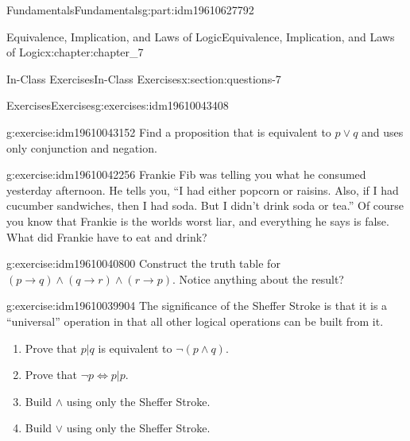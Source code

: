 \documentclass[oneside,10pt,]{book}
\numberwithin{equation}{section}
\begin{document}
\begin{partptx}{Fundamentals}{}{Fundamentals}{}{}{g:part:idm19610627792}
\begin{chapterptx}{Equivalence, Implication, and Laws of Logic}{}{Equivalence, Implication, and Laws of Logic}{}{}{x:chapter:chapter_7}
\typeout{************************************************}
%
\begin{sectionptx}{In-Class Exercises}{}{In-Class Exercises}{}{}{x:section:questions-7}
%
%
%
\typeout{************************************************}
\typeout{************************************************}
%
\begin{exercises-subsection-numberless}{Exercises}{}{Exercises}{}{}{g:exercises:idm19610043408}
\par\medskip\noindent%
%
\begin{exercisegroup}
\begin{divisionexerciseeg}{1}{}{}{g:exercise:idm19610043152}%
Find a proposition that is equivalent to \(p \lor  q\) and uses only conjunction and negation.%
\end{divisionexerciseeg}%
\begin{divisionexerciseeg}{2}{}{}{g:exercise:idm19610042256}%
Frankie Fib was telling you what he consumed yesterday afternoon. He tells you, ``I had either popcorn or raisins. Also, if I had cucumber sandwiches, then I had soda. But I didn't drink soda or tea.'' Of course you know that Frankie is the worlds worst liar, and everything he says is false. What did Frankie have to eat and drink?%
\end{divisionexerciseeg}%
\begin{divisionexerciseeg}{3}{}{}{g:exercise:idm19610040800}%
Construct the truth table for \((p \rightarrow q) \land (q \rightarrow r) \land (r \rightarrow p)\).   Notice anything about the result?%
\end{divisionexerciseeg}%
\begin{divisionexerciseeg}{4}{}{}{g:exercise:idm19610039904}%
The significance of the Sheffer Stroke is that it is a ``universal'' operation in that all other logical operations can be built from it.%
\begin{enumerate}[label=(\alph*)]
\item{}Prove that \(p | q\) is equivalent to \(\neg (p \land  q)\).%
\item{}Prove that \(\neg p \Leftrightarrow  p | p\).%
\item{}Build \(\land\) using only the Sheffer Stroke.%
\item{}Build \(\lor\) using only the Sheffer Stroke.%
\end{enumerate}
%
\end{divisionexerciseeg}%
\end{exercisegroup}

\end{exercises-subsection-numberless}
\end{sectionptx}
\end{chapterptx}
\end{partptx}
\end{document}
